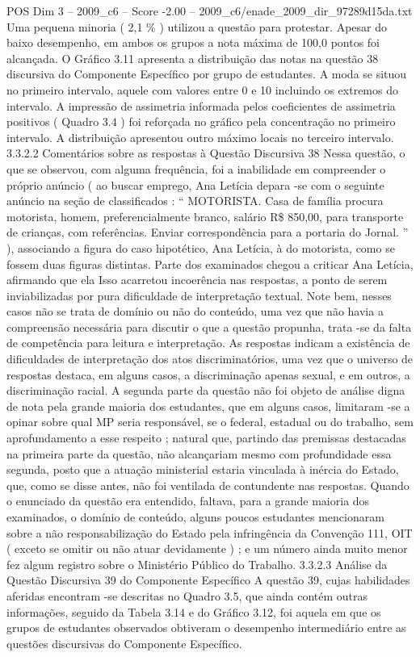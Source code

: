 \begin{textsample}{POS Dim 3 – 2009\_c6 – Score -2.00 – 2009\_c6/enade\_2009\_dir\_97289d15da.txt}
Uma pequena minoria ( 2,1 \% ) utilizou a questão para protestar.
Apesar do baixo desempenho, em ambos os grupos a nota máxima de 100,0 pontos foi alcançada.
O Gráfico 3.11 apresenta a distribuição das notas na questão 38 discursiva do Componente Específico por grupo de estudantes.
A moda se situou no primeiro intervalo, aquele com valores entre 0 e 10 incluindo os extremos do intervalo.
A impressão de assimetria informada pelos coeficientes de assimetria positivos ( Quadro 3.4 ) foi reforçada no gráfico pela concentração no primeiro intervalo.
A distribuição apresentou outro máximo locais no terceiro intervalo. 3.3.2.2 Comentários sobre as respostas à Questão Discursiva 38 Nessa questão, o que se observou, com alguma frequência, foi a inabilidade em compreender o próprio anúncio ( ao buscar emprego, Ana Letícia depara -se com o seguinte anúncio na seção de classificados : “ MOTORISTA.
Casa de família procura motorista, homem, preferencialmente branco, salário R\$ 850,00, para transporte de crianças, com referências.
Enviar correspondência para a portaria do Jornal. ” ), associando a figura do caso hipotético, Ana Letícia, à do motorista, como se fossem duas figuras distintas.
Parte dos examinados chegou a criticar Ana Letícia, afirmando que ela Isso acarretou incoerência nas respostas, a ponto de serem inviabilizadas por pura dificuldade de interpretação textual.
Note bem, nesses casos não se trata de domínio ou não do conteúdo, uma vez que não havia a compreensão necessária para discutir o que a questão propunha, trata -se da falta de competência para leitura e interpretação.
As respostas indicam a existência de dificuldades de interpretação dos atos discriminatórios, uma vez que o universo de respostas destaca, em alguns casos, a discriminação apenas sexual, e em outros, a discriminação racial.
A segunda parte da questão não foi objeto de análise digna de nota pela grande maioria dos estudantes, que em alguns casos, limitaram -se a opinar sobre qual MP seria responsável, se o federal, estadual ou do trabalho, sem aprofundamento a esse respeito ; natural que, partindo das premissas destacadas na primeira parte da questão, não alcançariam mesmo com profundidade essa segunda, posto que a atuação ministerial estaria vinculada à inércia do Estado, que, como se disse antes, não foi ventilada de contundente nas respostas.
Quando o enunciado da questão era entendido, faltava, para a grande maioria dos examinados, o domínio de conteúdo, alguns poucos estudantes mencionaram sobre a não responsabilização do Estado pela infringência da Convenção 111, OIT ( exceto se omitir ou não atuar devidamente ) ; e um número ainda muito menor fez algum registro sobre o Ministério Público do Trabalho. 3.3.2.3 Análise da Questão Discursiva 39 do Componente Específico A questão 39, cujas habilidades aferidas encontram -se descritas no Quadro 3.5, que ainda contém outras informações, seguido da Tabela 3.14 e do Gráfico 3.12, foi aquela em que os grupos de estudantes observados obtiveram o desempenho intermediário entre as questões discursivas do Componente Específico.

\end{textsample}
